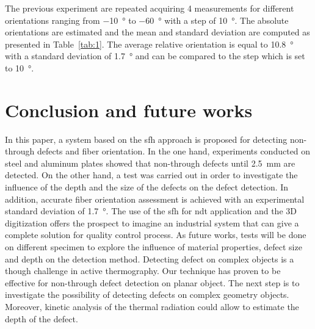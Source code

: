 \documentclass[12pt]{spieman}
\begin{document}
\begin{spacing}{2}


	




The previous experiment are repeated acquiring 4 measurements for different orientations ranging from \SI{-10}{\degree} to \SI{-60}{\degree} with a step of \SI{10}{\degree}.
The absolute orientations are estimated and the mean and standard deviation are computed as presented in Table~\ref{tab:1}.
The average relative orientation is equal to \SI{10.8}{\degree} with a standard deviation of \SI{1.7}{\degree} and can be compared to the step which is set to \SI{10}{\degree}.


% 
\newpage

\section{Conclusion and future works}\label{sec:5}

In this paper, a system based on the \ac{sfh} approach is proposed for detecting non-through defects and fiber orientation. 
In the one hand, experiments conducted on steel and aluminum plates showed that non-through defects until \SI{2.5}{\milli \metre} are detected. 
On the other hand, a test was carried out in order to investigate the influence of the depth and the size of the defects on the defect detection.
In addition, accurate fiber orientation assessment is achieved with an experimental standard deviation of \SI{1.7}{\degree}. 
The use of the \ac{sfh} for \ac{ndt} application and the 3D digitization offers the prospect to imagine an industrial system that can give a complete solution for quality control process. 
As future works, tests will be done on different specimen to explore the influence of material properties, defect size and depth on the detection method. 
Detecting defect on complex objects is a though challenge in active thermography. 
Our technique has proven to be effective for non-through defect detection on planar object. 
The next step is to investigate the possibility of detecting defects on complex geometry objects.   
Moreover, kinetic analysis of the thermal radiation could allow to estimate the depth of the defect.

% 

\acknowledgments     %


\end{spacing}
\end{document}
